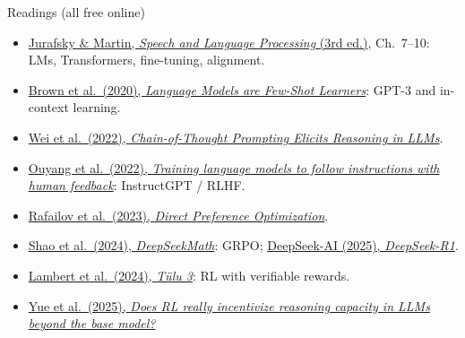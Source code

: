 \begin{frame}{Readings (all free online)}
\begin{itemize}\setlength{\itemsep}{6pt}
  \item \href{https://web.stanford.edu/~jurafsky/slp3/}{Jurafsky \& Martin, \emph{Speech and Language Processing} (3rd ed.)}, Ch.\ 7--10: LMs, Transformers, fine-tuning, alignment.
  \item \href{https://arxiv.org/abs/2005.14165}{Brown et al.\ (2020), \emph{Language Models are Few-Shot Learners}}: GPT-3 and in-context learning.
  \item \href{https://arxiv.org/abs/2201.11903}{Wei et al.\ (2022), \emph{Chain-of-Thought Prompting Elicits Reasoning in LLMs}}.
  \item \href{https://arxiv.org/abs/2203.02155}{Ouyang et al.\ (2022), \emph{Training language models to follow instructions with human feedback}}: InstructGPT / RLHF.
  \item \href{https://arxiv.org/abs/2305.18290}{Rafailov et al.\ (2023), \emph{Direct Preference Optimization}}.
  \item \href{https://arxiv.org/abs/2402.03300}{Shao et al.\ (2024), \emph{DeepSeekMath}}: GRPO; \href{https://arxiv.org/abs/2501.12948}{DeepSeek-AI (2025), \emph{DeepSeek-R1}}.
  \item \href{https://arxiv.org/abs/2411.15124}{Lambert et al.\ (2024), \emph{T\"ulu 3}}: RL with verifiable rewards.
  \item \href{https://arxiv.org/abs/2504.13837}{Yue et al.\ (2025), \emph{Does RL really incentivize reasoning capacity in LLMs beyond the base model?}}
\end{itemize}
\end{frame}

